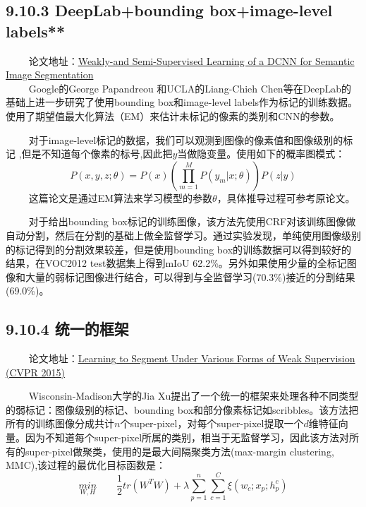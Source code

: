 \subsection{9.10.3 DeepLab+bounding box+image-level
labels**}\label{deeplabbounding-boximage-level-labels}

   论文地址：\href{https://arxiv.org/pdf/1502.02734.pdf}{Weakly-and
Semi-Supervised Learning of a DCNN for Semantic Image Segmentation}\\
   Google的George Papandreou 和UCLA的Liang-Chieh
Chen等在DeepLab的基础上进一步研究了使用bounding box和image-level
labels作为标记的训练数据。使用了期望值最大化算法（EM）来估计未标记的像素的类别和CNN的参数。

   对于image-level标记的数据，我们可以观测到图像的像素值和图像级别的标记
,但是不知道每个像素的标号,因此把\(y\)当做隐变量。使用如下的概率图模式：
\[
P\left ( x,y,z;\theta \right ) = P\left ( x \right )\left (\prod_{m=1}^{M} P\left ( y_m|x;\theta \right )\right )P\left ( z|y \right )
\]   
这篇论文是通过EM算法来学习模型的参数\(\theta\)，具体推导过程可参考原论文。

   对于给出bounding
box标记的训练图像，该方法先使用CRF对该训练图像做自动分割，然后在分割的基础上做全监督学习。通过实验发现，单纯使用图像级别的标记得到的分割效果较差，但是使用bounding
box的训练数据可以得到较好的结果，在VOC2012 test数据集上得到mIoU
62.2\%。另外如果使用少量的全标记图像和大量的弱标记图像进行结合，可以得到与全监督学习(70.3\%)接近的分割结果(69.0\%)。

\subsection{9.10.4 统一的框架}\label{ux7edfux4e00ux7684ux6846ux67b6}

  
论文地址：\href{https://www.cv-foundation.org/openaccess/content_cvpr_2015/papers/Xu_Learning_to_Segment_2015_CVPR_paper.pdf}{Learning
to Segment Under Various Forms of Weak Supervision (CVPR 2015)}

   Wisconsin-Madison大学的Jia
Xu提出了一个统一的框架来处理各种不同类型的弱标记：图像级别的标记、bounding
box和部分像素标记如scribbles。该方法把所有的训练图像分成共计\(n\)个super-pixel，对每个super-pixel提取一个\(d\)维特征向量。因为不知道每个super-pixel所属的类别，相当于无监督学习，因此该方法对所有的super-pixel做聚类，使用的是最大间隔聚类方法(max-margin
clustering, MMC),该过程的最优化目标函数是： \[
\underset{W,H}{min} \qquad  \frac{1}{2}tr\left ( W^TW \right ) + \lambda\sum_{p=1}^{n}\sum_{c=1}^{C}\xi \left ( w_c;x_p;h_p^c \right)
\]

